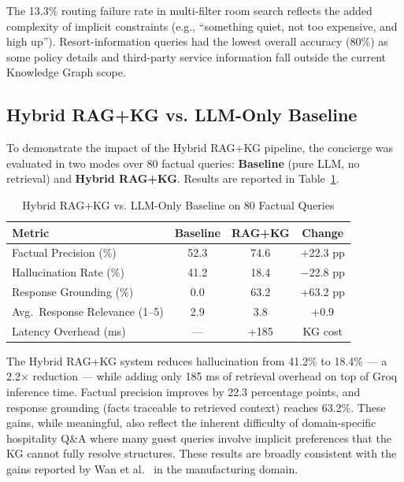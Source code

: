 \documentclass[11pt,a4paper]{report}
\begin{document}
The 13.3\% routing failure rate in multi-filter room search reflects the added complexity of implicit constraints (e.g., ``something quiet, not too expensive, and high up''). Resort-information queries had the lowest overall accuracy (80\%) as some policy details and third-party service information fall outside the current Knowledge Graph scope.

\subsection{Hybrid RAG+KG vs. LLM-Only Baseline}

To demonstrate the impact of the Hybrid RAG+KG pipeline, the concierge was evaluated in two modes over 80 factual queries: \textbf{Baseline} (pure LLM, no retrieval) and \textbf{Hybrid RAG+KG}. Results are reported in Table~\ref{tab:ragkg_eval}.

\begin{table}[H]
\centering
\caption{Hybrid RAG+KG vs. LLM-Only Baseline on 80 Factual Queries}
\label{tab:ragkg_eval}
\renewcommand{\arraystretch}{1.4}
\begin{tabular}{p{5.5cm} c c c}
\toprule
\textbf{Metric} & \textbf{Baseline} & \textbf{RAG+KG} & \textbf{Change} \\
\midrule
\rowcolor{rowgray}
Factual Precision (\%) & 52.3 & 74.6 & +22.3 pp \\
Hallucination Rate (\%) & 41.2 & 18.4 & $-$22.8 pp \\
\rowcolor{rowgray}
Response Grounding (\%) & 0.0 & 63.2 & +63.2 pp \\
Avg.\ Response Relevance (1--5) & 2.9 & 3.8 & +0.9 \\
\rowcolor{rowgray}
Latency Overhead (ms) & --- & +185 & KG cost \\
\bottomrule
\end{tabular}
\end{table}

The Hybrid RAG+KG system reduces hallucination from 41.2\% to 18.4\% — a 2.2$\times$ reduction — while adding only 185 ms of retrieval overhead on top of Groq inference time. Factual precision improves by 22.3 percentage points, and response grounding (facts traceable to retrieved context) reaches 63.2\%. These gains, while meaningful, also reflect the inherent difficulty of domain-specific hospitality Q\&A where many guest queries involve implicit preferences that the KG cannot fully resolve structures. These results are broadly consistent with the gains reported by Wan et al.~\cite{wan2025hybridrag} in the manufacturing domain.
\end{document}
